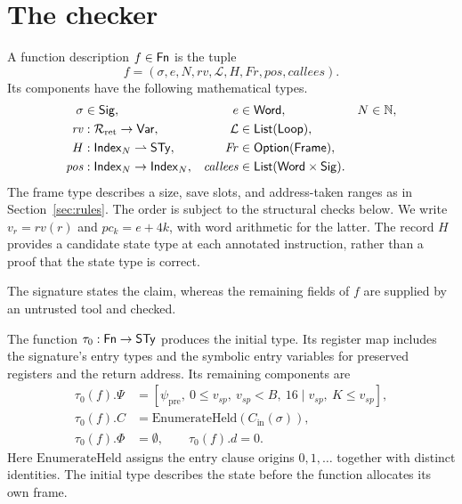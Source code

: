\section{The checker}\label{sec:checker}
\begin{definition}\label{def:fn}
A function description $f\in\mathsf{Fn}$ is the tuple
\[f=(\sigma,e,N,\mathit{rv},\mathcal L,H,\mathit{Fr},\mathit{pos},\mathit{callees}).\]
Its components have the following mathematical types.
\[
\begin{aligned}
\sigma&\in\mathsf{Sig},&e&\in\mathsf{Word},&N&\in\mathbb{N},\\
\mathit{rv}&:\mathcal R_{\mathrm{ret}}\to\mathsf{Var},&\mathcal L&\in\mathsf{List}(\mathsf{Loop}),\\
H&:\mathsf{Index}_N\rightharpoonup\mathsf{STy},&\mathit{Fr}&\in\mathsf{Option}(\mathsf{Frame}),\\
\mathit{pos}&:\mathsf{Index}_N\to\mathsf{Index}_N,&\mathit{callees}&\in\mathsf{List}(\mathsf{Word}\times\mathsf{Sig}).
\end{aligned}
\]
The frame type describes a size, save slots, and address-taken ranges as in Section~\ref{sec:rules}. The order is subject to the structural checks below. We write $v_r=\mathit{rv}(r)$ and $pc_k=e+4k$, with word arithmetic for the latter. The record $H$ provides a candidate state type at each annotated instruction, rather than a proof that the state type is correct.
\end{definition}

The signature states the claim, whereas the remaining fields of $f$ are supplied by an untrusted tool and checked.

\begin{definition}\label{def:initty}
The function $\tau_0:\mathsf{Fn}\to\mathsf{STy}$ produces the initial type. Its register map includes the signature's entry types and the symbolic entry variables for preserved registers and the return address. Its remaining components are
\[
\begin{aligned}
\tau_0(f).\Psi&=[\psi_{\mathrm{pre}},\ 0\le v_{\mathit{sp}},\ v_{\mathit{sp}}<B,\ 16\mid v_{\mathit{sp}},\ K\le v_{\mathit{sp}}],\\
\tau_0(f).C&=\mathrm{EnumerateHeld}(C_{\mathrm{in}}(\sigma)),\\
\tau_0(f).\Phi&=\emptyset,\qquad\tau_0(f).d=0.
\end{aligned}
\]
Here $\mathrm{EnumerateHeld}$ assigns the entry clause origins $0,1,\ldots$ together with distinct identities. The initial type describes the state before the function allocates its own frame.
\end{definition}
